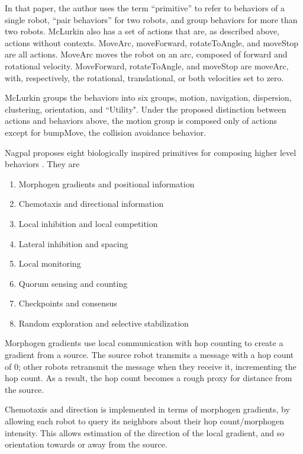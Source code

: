 \documentclass[]{article}
\begin{document}
In that paper, the author uses the term ``primitive'' to refer to behaviors of a single robot, ``pair behaviors'' for two robots, and group behaviors for more than two robots. 
McLurkin also has a set of actions that are, as described above, actions without contexts. 
MoveArc, moveForward, rotateToAngle, and moveStop are all actions. 
MoveArc moves the robot on an arc, composed of forward and rotational velocity. MoveForward, rotateToAngle, and moveStop are moveArc, with, respectively, the rotational, translational, or both velocities set to zero. 

McLurkin groups the behaviors into six groups, motion, navigation, dispersion, clustering, orientation, and ``Utility". Under the proposed distinction between actions and behaviors above, the motion group is composed only of actions except for bumpMove, the collision avoidance behavior. 

Nagpal proposes eight biologically inspired primitives for composing higher level behaviors \cite{nagpal2004catalog}. They are 
\begin{enumerate}[noitemsep]
\item Morphogen gradients and positional information
\item Chemotaxis and directional information
\item Local inhibition and local competition
\item Lateral inhibition and spacing
\item Local monitoring
\item Quorum sensing and counting
\item Checkpoints and consensus
\item Random exploration and selective stabilization
\end{enumerate}

Morphogen gradients use local communication with hop counting to create a gradient from a source. 
The source robot transmits a message with a hop count of 0; other robots retransmit the message when they receive it, incrementing the hop count. 
As a result, the hop count becomes a rough proxy for distance from the source. 

Chemotaxis and direction is implemented in terms of morphogen gradients, by allowing each robot to query its neighbors about their hop count/morphogen intensity. 
This allows estimation of the direction of the local gradient, and so orientation towards or away from the source. 
\end{document}

